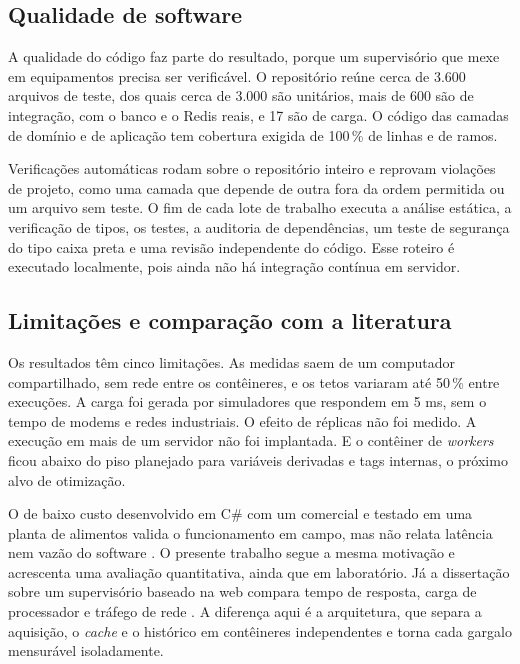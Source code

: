 \subsection{Qualidade de software}

\par A qualidade do código faz parte do resultado, porque um supervisório que mexe em equipamentos precisa ser verificável. O repositório reúne cerca de 3.600 arquivos de teste, dos quais cerca de 3.000 são unitários, mais de 600 são de integração, com o banco e o Redis reais, e 17 são de carga. O código das camadas de domínio e de aplicação tem cobertura exigida de 100\,\% de linhas e de ramos.

\par Verificações automáticas rodam sobre o repositório inteiro e reprovam violações de projeto, como uma camada que depende de outra fora da ordem permitida ou um arquivo sem teste. O fim de cada lote de trabalho executa a análise estática, a verificação de tipos, os testes, a auditoria de dependências, um teste de segurança do tipo caixa preta e uma revisão independente do código. Esse roteiro é executado localmente, pois ainda não há integração contínua em servidor.


\subsection{Limitações e comparação com a literatura}

\par Os resultados têm cinco limitações. As medidas saem de um computador compartilhado, sem rede entre os contêineres, e os tetos variaram até 50\,\% entre execuções. A carga foi gerada por simuladores que respondem em 5 ms, sem o tempo de modems e redes industriais. O efeito de réplicas não foi medido. A execução em mais de um servidor não foi implantada. E o contêiner de \emph{workers} ficou abaixo do piso planejado para variáveis derivadas e tags internas, o próximo alvo de otimização.

\par O  de baixo custo desenvolvido em C\# com um  comercial e testado em uma planta de alimentos valida o funcionamento em campo, mas não relata latência nem vazão do software \cite{PHUYAL2020_COST_EFFICIENT_SCADA}. O presente trabalho segue a mesma motivação e acrescenta uma avaliação quantitativa, ainda que em laboratório. Já a dissertação sobre um supervisório baseado na web compara tempo de resposta, carga de processador e tráfego de rede \cite{AHMED2011_EFFICIENT_WEB_SCADA}. A diferença aqui é a arquitetura, que separa a aquisição, o \emph{cache} e o histórico em contêineres independentes e torna cada gargalo mensurável isoladamente.
